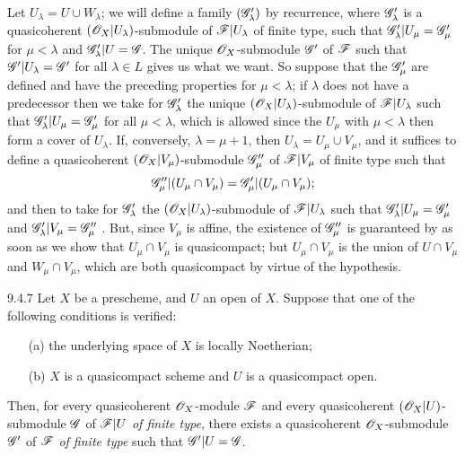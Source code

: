 \documentclass{book}
\begin{document}
Let $U_\lambda=U\cup W_\lambda$; we will define a family $(\mathscr{G}'_\lambda)$
by recurrence, where $\mathscr{G}'_\lambda$ is a quasicoherent
$(\mathscr{O}_X|U_\lambda)$-submodule of $\mathscr{F}|U_\lambda$ of finite type, such that
$\mathscr{G}'_\lambda|U_\mu=\mathscr{G}'_\mu$ for $\mu<\lambda$ and
$\mathscr{G}'_\lambda|U=\mathscr{G}$. The unique $\mathscr{O}_X$-submodule $\mathscr{G}'$ of
$\mathscr{F}$ such that $\mathscr{G}'|U_\lambda=\mathscr{G}'$ for all $\lambda\in L$
 gives us what we want. So suppose that the $\mathscr{G}'_\mu$
are defined and have the preceding properties for $\mu<\lambda$; if $\lambda$
does not have a predecessor then we take for $\mathscr{G}'_\lambda$ the unique
$(\mathscr{O}_X|U_\lambda)$-submodule of $\mathscr{F}|U_\lambda$ such that
$\mathscr{G}'_\lambda|U_\mu=\mathscr{G}'_\mu$ for all $\mu<\lambda$, which is
allowed since the $U_\mu$ with $\mu<\lambda$ then form a cover of $U_\lambda$.
If, conversely, $\lambda=\mu+1$, then $U_\lambda=U_\mu\cup V_\mu$, and it
suffices to define a quasicoherent $(\mathscr{O}_X|V_\mu)$-submodule $\mathscr{G}''_\mu$
of $\mathscr{F}|V_\mu$ of finite type such that
\[
  \mathscr{G}''_\mu|(U_\mu\cap V_\mu)=\mathscr{G}'_\mu|(U_\mu\cap V_\mu);
\]
and then to take for $\mathscr{G}'_\lambda$ the
$(\mathscr{O}_X|U_\lambda)$-submodule of $\mathscr{F}|U_\lambda$ such that
$\mathscr{G}'_\lambda|U_\mu=\mathscr{G}'_\mu$ and
$\mathscr{G}'_\lambda|V_\mu=\mathscr{G}''_\mu$ . But, since
$V_\mu$ is affine, the existence of $\mathscr{G}''_\mu$ is guaranteed by 
as soon as we show that $U_\mu\cap V_\mu$ is quasicompact; but $U_\mu\cap V_\mu$
is the union of $U\cap V_\mu$ and $W_\mu\cap V_\mu$, which are both
quasicompact by virtue of the hypothesis.

\begin{envs}[Theorem]{9.4.7}
\label{lem-1.9.4.7}
Let $X$ be a prescheme, and $U$ an open of $X$.
Suppose that one of the following conditions is verified:
\begin{itemize}
  \item[(a)] the underlying space of $X$ is locally Noetherian;
  \item[(b)] $X$ is a quasicompact scheme and $U$ is a quasicompact open.
\end{itemize}
Then, for every quasicoherent $\mathscr{O}_X$-module $\mathscr{F}$ and every quasicoherent
$(\mathscr{O}_X|U)$-submodule $\mathscr{G}$ of $\mathscr{F}|U$ \emph{of finite type}, there exists a
quasicoherent $\mathscr{O}_X$-submodule $\mathscr{G}'$ of $\mathscr{F}$ \emph{of finite type}
such that $\mathscr{G}'|U=\mathscr{G}$.
\end{envs}
\end{document}
